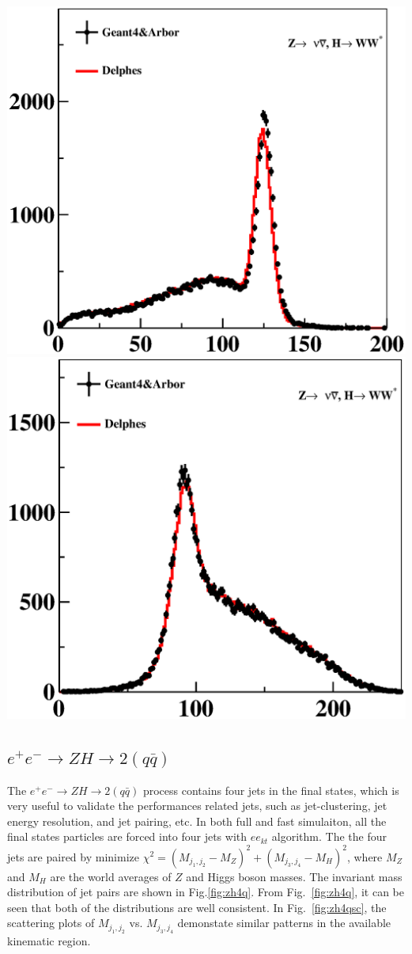 \documentclass[a4paper,10pt,twoside]{cpc-hepnp}
\begin{document}
\begin{multicols}{2}
\begin{center}
\includegraphics[width=0.4\linewidth]{figs/nnh_mass}
\includegraphics[width=0.4\linewidth]{figs/nnh_reco}
\end{center}

\subsection{$e^+e^- \to ZH \to 2(q\bar{q})$}

The $e^+e^- \to ZH \to 2(q\bar{q})$ process contains four jets in the final states, which is very useful
to validate the performances related jets, such as jet-clustering, jet energy resolution, and jet pairing, etc.
In both full and fast simulaiton, all the final states particles are forced into four jets with $ee_{kt}$ algorithm.
The the four jets are paired by minimize $\chi^2 = (M_{j_1,j_2} - M_Z)^2 + (M_{j_3,j_4}-M_H)^2$,
where $M_Z$ and $M_H$ are the world averages of $Z$ and Higgs boson masses. 
The invariant mass distribution of jet pairs are shown in Fig.\ref{fig:zh4q}.
From Fig.~\ref{fig:zh4q}, it can be seen that both of the distributions are well consistent.
In Fig.~\ref{fig:zh4qsc}, the scattering plots of $M_{j_1,j_2}$  vs. $M_{j_3,j_4}$ 
demonstate similar patterns in the available kinematic region.


\end{multicols}
\end{document}
